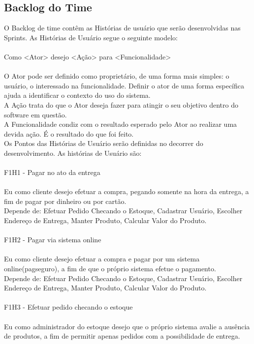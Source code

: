 \subsection{Backlog do Time}
O Backlog de time contêm as Histórias de usuário que serão desenvolvidas nas Sprints. As Histórias de Usuário segue o seguinte modelo:\\
\\
\tab Como <Ator> desejo <Ação> para <Funcionalidade>\\
\\
\tab O Ator pode ser definido como proprietário, de uma forma mais simples: o usuário, o interessado na funcionalidade. Definir o ator de uma forma específica ajuda a identificar o contexto do uso do sistema.\\
\tab A Ação trata do que o Ator deseja fazer para atingir o seu objetivo dentro do software em questão.\\
\tab A Funcionalidade condiz com o resultado esperado pelo Ator ao realizar uma devida ação. É o resultado do que foi feito.\\
\tab Os Pontos das Histórias de Usuário serão definidas no decorrer do desenvolvimento. As histórias de Usuário são:\\
\\
\tab F1H1 - Pagar no ato da entrega \\
\\
\tab Eu como cliente desejo efetuar a compra, pegando somente na hora da entrega, a fim de pagar por dinheiro ou por cartão.\\
\tab Depende de: Efetuar Pedido Checando o Estoque, Cadastrar Usuário, Escolher Endereço de Entrega, Manter Produto, Calcular Valor do Produto.\\
\\
\tab F1H2 - Pagar via sistema online\\
\\
\tab Eu como cliente desejo efetuar a compra e pagar por um sistema online(pagseguro), a fim de que o próprio sistema efetue o pagamento.\\
Depende de: Efetuar Pedido Checando o Estoque, Cadastrar Usuário, Escolher Endereço de Entrega, Manter Produto, Calcular Valor do Produto.\\
\\
\tab F1H3 - Efetuar pedido checando o estoque\\
\\
\tab Eu como administrador do estoque desejo que o próprio sistema avalie a ausência de produtos, a fim de permitir apenas pedidos com a possibilidade de entrega.\\
